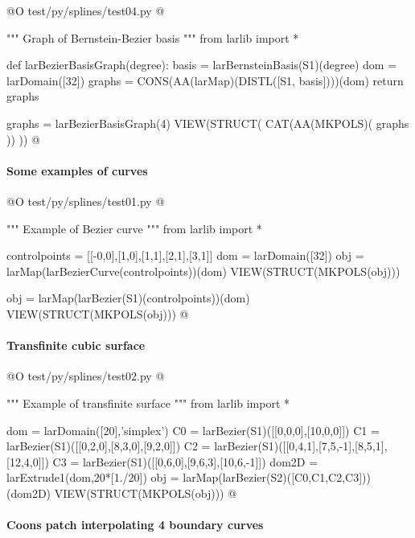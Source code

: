 \documentclass[11pt,oneside]{article}	%
\begin{document}
@O  test/py/splines/test04.py
@{""" Graph of Bernstein-Bezier basis """
from larlib import *

def larBezierBasisGraph(degree):
	basis = larBernsteinBasis(S1)(degree)
	dom = larDomain([32])
	graphs = CONS(AA(larMap)(DISTL([S1, basis])))(dom)
	return graphs

graphs = larBezierBasisGraph(4)
VIEW(STRUCT( CAT(AA(MKPOLS)( graphs )) ))
@}


\paragraph{Some examples of curves}

@O test/py/splines/test01.py 
@{""" Example of Bezier curve """
from larlib import *

controlpoints = [[-0,0],[1,0],[1,1],[2,1],[3,1]]
dom = larDomain([32])
obj = larMap(larBezierCurve(controlpoints))(dom)
VIEW(STRUCT(MKPOLS(obj)))

obj = larMap(larBezier(S1)(controlpoints))(dom)
VIEW(STRUCT(MKPOLS(obj)))
@}

\paragraph{Transfinite cubic surface}

@O test/py/splines/test02.py  
@{""" Example of transfinite surface """
from larlib import *

dom = larDomain([20],'simplex')
C0 = larBezier(S1)([[0,0,0],[10,0,0]])
C1 = larBezier(S1)([[0,2,0],[8,3,0],[9,2,0]])
C2 = larBezier(S1)([[0,4,1],[7,5,-1],[8,5,1],[12,4,0]])
C3 = larBezier(S1)([[0,6,0],[9,6,3],[10,6,-1]])
dom2D = larExtrude1(dom,20*[1./20])
obj = larMap(larBezier(S2)([C0,C1,C2,C3]))(dom2D)
VIEW(STRUCT(MKPOLS(obj)))
@}

\paragraph{Coons patch interpolating 4 boundary curves}
\end{document}
